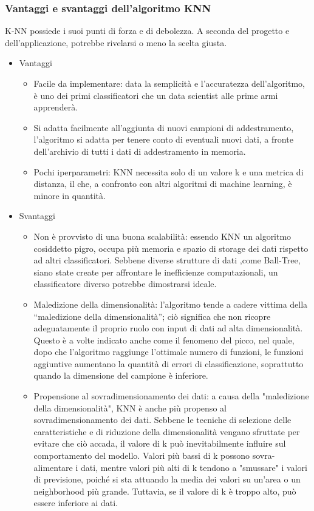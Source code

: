\subsubsection{Vantaggi e svantaggi dell'algoritmo KNN}
K-NN possiede i suoi punti di forza e di debolezza. A seconda del progetto e dell'applicazione, potrebbe rivelarsi o meno la scelta giusta.
\begin{itemize}
\item Vantaggi
\begin{itemize}
\item Facile da implementare: data la semplicità e l'accuratezza dell'algoritmo, è uno dei primi classificatori che un data scientist alle prime armi apprenderà.
\item Si adatta facilmente all'aggiunta di nuovi campioni di addestramento, l'algoritmo si adatta per tenere conto di eventuali nuovi dati, a fronte dell'archivio di tutti i dati di addestramento in memoria.
\item Pochi iperparametri: KNN necessita solo di un valore k e una metrica di distanza, il che, a confronto con altri algoritmi di machine learning, è minore in quantità.
\end{itemize}
\item Svantaggi
\begin{itemize}
\item Non è provvisto di una buona scalabilità: essendo KNN un algoritmo cosiddetto pigro, occupa più memoria e spazio di storage dei dati rispetto ad altri classificatori.
Sebbene diverse strutture di dati ,come Ball-Tree, siano state create per affrontare le inefficienze computazionali, un classificatore diverso potrebbe dimostrarsi ideale.
\item Maledizione della dimensionalità: l'algoritmo tende a cadere vittima della “maledizione della dimensionalità”; ciò significa che non ricopre adeguatamente il proprio ruolo con input di dati ad alta dimensionalità.
Questo è a volte indicato anche come il fenomeno del picco, nel quale, dopo che l'algoritmo raggiunge l'ottimale numero di funzioni, le funzioni aggiuntive aumentano la quantità di errori di classificazione, soprattutto quando la dimensione del campione è inferiore.
\item Propensione al sovradimensionamento dei dati: a causa della "maledizione della dimensionalità", KNN è anche più propenso al sovradimensionamento dei dati.
Sebbene le tecniche di selezione delle caratteristiche e di riduzione della dimensionalità vengano sfruttate per evitare che ciò accada, il valore di k può inevitabilmente influire sul comportamento del modello.
Valori più bassi di k possono sovra-alimentare i dati, mentre valori più alti di k tendono a "smussare" i valori di previsione, poiché si sta attuando la media dei valori su un'area o un neighborhood più grande.
Tuttavia, se il valore di k è troppo alto, può essere inferiore ai dati.
\end{itemize}
\end{itemize}

